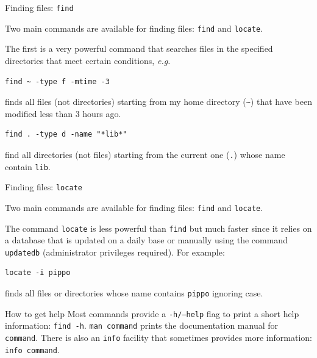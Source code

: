 \documentclass{beamer}
\begin{document}
\begin{frame}[t,fragile]{Finding files: \texttt{find}}
\vspace{0.5cm}
\begin{overlayarea}{\textwidth}{0.15\textheight}
Two main commands are available for finding files: \texttt{find} and \texttt{locate}.
\end{overlayarea}
\vspace{0.5cm}
The first is a very powerful command that searches files in the specified directories that meet certain conditions, \textit{e.g.}
\begin{lstlisting}
find ~ -type f -mtime -3
\end{lstlisting}
finds all files (not directories) starting from my home directory (\texttt{\~{}}) that have been modified less than 3 hours ago.
\begin{lstlisting}
find . -type d -name "*lib*"
\end{lstlisting}
find all directories (not files) starting from the current one (\texttt{.}) whose name contain \texttt{lib}.
\end{frame}

\begin{frame}[t,fragile]{Finding files: \texttt{locate}}
\vspace{0.5cm}
\begin{overlayarea}{\textwidth}{0.15\textheight}
    Two main commands are available for finding files: \texttt{find} and \texttt{locate}.
\end{overlayarea}
\vspace{0.5cm}
The command \texttt{locate} is less powerful than \texttt{find} but much faster since it relies on a database that is updated on a daily base or manually using the command \texttt{updatedb} (administrator privileges required).
\vfill
For example:
\begin{lstlisting}
locate -i pippo
\end{lstlisting}
finds all files or directories whose name contains \texttt{pippo}
ignoring case.
\end{frame}

\begin{frame}[fragile]{How to get help}
Most commands provide a \texttt{-h/--help} flag to print a short help information: \texttt{find -h}.
\vfill
\texttt{man command} prints the documentation manual for \texttt{command}.
\vfill
There is also an \texttt{info} facility that sometimes provides more information: \texttt{info command}.
\end{frame}
\end{document}
